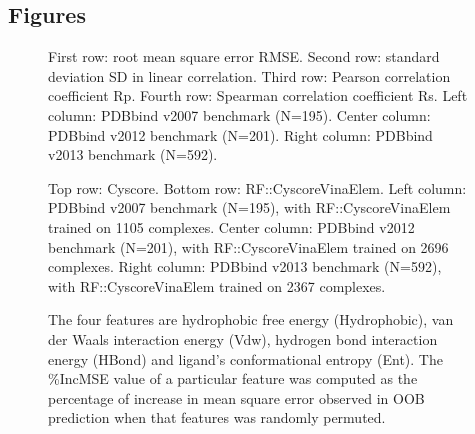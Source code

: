 \documentclass[linenumbers]{bmcart}
\begin{document}
\begin{backmatter}


\section*{Figures}

\begin{figure}[h]
\caption{ First row: root mean square error RMSE. Second row: standard deviation SD in linear correlation. Third row: Pearson correlation coefficient Rp. Fourth row: Spearman correlation coefficient Rs. Left column: PDBbind v2007 benchmark (N=195). Center column: PDBbind v2012 benchmark (N=201). Right column: PDBbind v2013 benchmark (N=592).}
\label{fig:stat}
\end{figure}

\begin{figure}[h]
\caption{ Top row: Cyscore. Bottom row: RF::CyscoreVinaElem. Left column: PDBbind v2007 benchmark (N=195), with RF::CyscoreVinaElem trained on 1105 complexes. Center column: PDBbind v2012 benchmark (N=201), with RF::CyscoreVinaElem trained on 2696 complexes. Right column: PDBbind v2013 benchmark (N=592), with RF::CyscoreVinaElem trained on 2367 complexes.}
\label{fig:cor}
\end{figure}

\begin{figure}[h]
\caption{ The four features are hydrophobic free energy (Hydrophobic), van der Waals interaction energy (Vdw), hydrogen bond interaction energy (HBond) and ligand's conformational entropy (Ent). The \%IncMSE value of a particular feature was computed as the percentage of increase in mean square error observed in OOB prediction when that features was randomly permuted.}
\label{fig:varimp}
\end{figure}


\end{backmatter}
\end{document}
